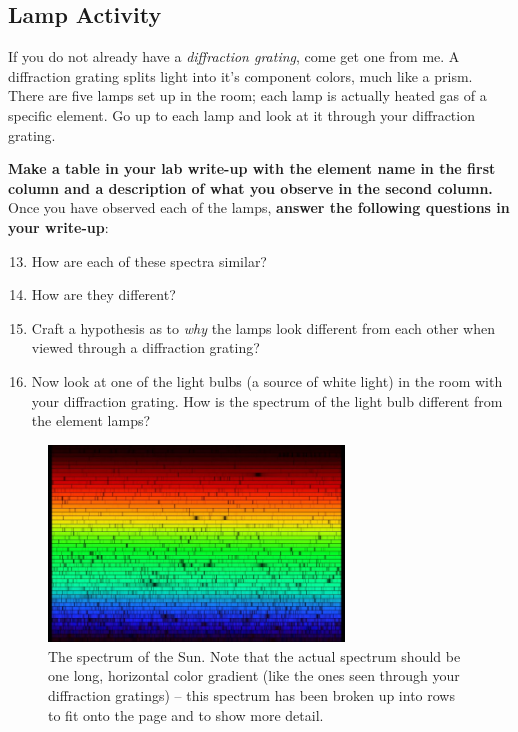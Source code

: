 \documentclass[11pt]{article}
\begin{document}
\subsection{Lamp Activity}

If you do not already have a \emph{diffraction grating}, come get one from me. A diffraction grating splits light into it's component colors, much like a prism. There are five lamps set up in the room; each lamp is actually heated gas of a specific element. Go up to each lamp and look at it through your diffraction grating.  
\bigskip 

\textbf{Make a table in your lab write-up with the element name in the first column and a description of what you observe in the second column.}  Once you have observed each of the lamps, \textbf{answer the following questions in your write-up}:
\begin{enumerate}
    \setcounter{enumi}{12}
    \item How are each of these spectra similar?
    \item How are they different?
    \item Craft a hypothesis as to \textit{why} the lamps look different from each other when viewed through a diffraction grating?
    \item Now look at one of the light bulbs (a source of white light) in the room with your diffraction grating. How is the spectrum of the light bulb different from the element lamps?
\end{enumerate}

\begin{figure}[h!]
    \centering
    \includegraphics[width=0.7\textwidth]{Images/sun_spec.jpg}
    \caption{The spectrum of the Sun. Note that the actual spectrum should be one long, horizontal color gradient (like the ones seen through your diffraction gratings) -- this spectrum has been broken up into rows to fit onto the page and to show more detail.}
    \label{fig:sun}
\end{figure}
\end{document}
